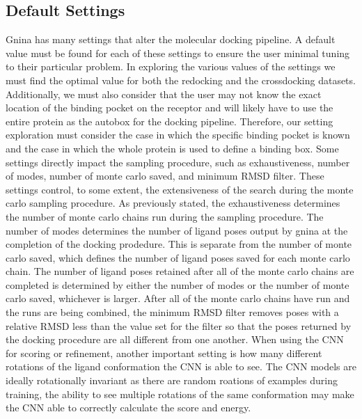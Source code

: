 \documentclass[journal=jcisd8,manuscript=article]{achemso}
\begin{document}
\subsection{Default Settings}
Gnina has many settings that alter the molecular docking pipeline. A default value must be found for each of these settings to ensure the user minimal tuning to their particular problem. In exploring the various values of the settings we must find the optimal value for both the redocking and the crossdocking datasets. Additionally, we must also consider that the user may not know the exact location of the binding pocket on the receptor and will likely have to use the entire protein as the autobox for the docking pipeline. Therefore, our setting exploration must consider the case in which the specific binding pocket is known and the case in which the whole protein is used to define a binding box. Some settings directly impact the sampling procedure, such as exhaustiveness, number of modes, number of monte carlo saved, and minimum RMSD filter. These settings control, to some extent, the extensiveness of the search during the monte carlo sampling procedure. As previously stated, the exhaustiveness determines the number of monte carlo chains run during the sampling procedure. The number of modes determines the number of ligand poses output by gnina at the completion of the docking prodedure. This is separate from the number of monte carlo saved, which defines the number of  ligand poses saved for each monte carlo chain. The number of ligand poses retained after all of the monte carlo chains are completed is determined by either the number of modes or the number of monte carlo saved, whichever is larger. After all of the monte carlo chains have run and the runs are being combined, the minimum RMSD filter removes poses with a relative RMSD less than the value set for the filter so that the poses returned by the docking procedure are all different from one another. When using the CNN for scoring or refinement, another important setting is how many different rotations of the ligand conformation the CNN is able to see. The CNN models are ideally rotationally invariant as there are random roations of examples during training, the ability to see multiple rotations of the same conformation may make the CNN able to correctly calculate the score and energy.
\end{document}
